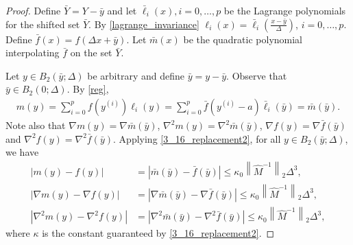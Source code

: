 \documentclass{article}
\begin{document}
\begin{proof}
Define $\bar{Y}=Y-\bar y$ and let $\bar{\ell}_i(x), i=0,\dots,p$ be the Lagrange polynomials for the shifted set $\bar{Y}$.
By \cref{lagrange_invariance} $\ell_i(x) = \bar{\ell}_i\left(\frac{x-\bar y}{\Delta}\right)$, $i=0,\ldots,p$.
Define $\bar{f}(x)= f(\Delta x + \bar y)$.
Let $\bar{m}(x)$ be the quadratic polynomial interpolating $\bar{f}$ on the set $\bar{Y}$.

Let $y \in B_2(\bar y;\Delta)$ be arbitrary and define $\bar{y} =y-\bar y$.
Observe that $\bar{y}  \in B_2(0;\Delta)$.
By \cref{reg},
\begin{align*}
m(y)=\sum_{i=0}^p f\left(y^{(i)}\right) \ell_i(y) = \sum_{i=0}^p \bar{f}\left(y^{(i)}-a\right) \bar{\ell}_i\left(\bar{y}\right)=\bar{m}\left(\bar{y}\right).
\end{align*}
Note also that $\nabla m(y)=\nabla \bar{m}(\bar{y})$, $\nabla^2 m(y)=\nabla^2 \bar{m}(\bar{y})$, $\nabla f(y)=\nabla \bar{f}(\bar{y})$ and $\nabla^2 f(y)=\nabla^2 \bar{f}(\bar{y})$.  
Applying \cref{3_16_replacement2}, for all $y \in B_2(\bar y;\Delta)$, we have
\begin{align}
|m(y)-f(y)| & = |\bar{m}(\bar{y})-\bar{f}(\bar{y})| \le \kappa_0 \left\| \hat{M}^{-1} \right\|_2 \Delta^3, \\
|\nabla m(y)-\nabla f(y)| & = |\nabla \bar{m}(\bar{y})-\nabla \bar{f}(\bar{y})| \le \kappa_0 \left\| \hat{M}^{-1} \right\|_2 \Delta^3, \\
|\nabla^2 m(y)-\nabla^2 f(y)| & = |\nabla^2 \bar{m}(\bar{y})- \nabla^2 \bar{f}(\bar{y})| \le \kappa_0 \left\| \hat{M}^{-1} \right\|_2 \Delta^3, 
\end{align}
where $\kappa$ is the constant guaranteed by \cref{3_16_replacement2}.
\end{proof}
\end{document}
